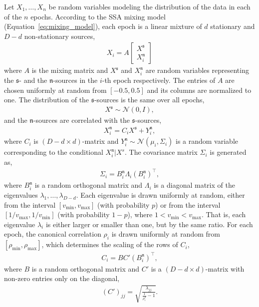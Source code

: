 \documentclass{article}
\newcommand{\N}{\ensuremath{\mathcal{N}}}
\newcommand{\1}{\ensuremath{\mathds{1}}}
\newcommand{\s}{\ensuremath{\mathfrak{s}}}
\newcommand{\n}{\ensuremath{\mathfrak{n}}}
\newcommand{\0}{\ensuremath{0}}
\begin{document}
Let $X_1, \ldots, X_n$ be random variables modeling the distribution of the data in each of 
the $n$ epochs. According to the SSA mixing model (Equation~\ref{eq:mixing_model}), each 
epoch is a linear mixture of $d$ stationary and $D-d$ non-stationary sources, 
\begin{align*}
	X_i = A \begin{bmatrix} X^\s \\ X^\n_i \end{bmatrix}
\end{align*}
where $A$ is the mixing matrix and $X^\s$ and $X^\n_i$ are random variables representing 
the \s- and the \n-sources in the $i$-th epoch respectively. The entries of $A$ are chosen 
uniformly at random from $[-0.5, 0.5]$ and its columns are normalized to one. The distribution
of the \s-sources is the same over all epochs, 
\begin{align*}
	X^\s \sim \N(0,I), 
\end{align*}
and the \n-sources are correlated with the \s-sources, 
\begin{align*}
	X^\n_i = C_i X^\s + Y^\n_i,  
\end{align*}
where $C_i$ is $(D-d \times d)$-matrix and $Y^\n_i \sim \N(\mu_i, \Sigma_i)$ is a
random variable corresponding to the conditional $X^\n_i | X^s$. The covariance 
matrix $\Sigma_i$ is generated as, 
\begin{align*}
	\Sigma_i = B^\n_i \Lambda_i (B^\n_i)^\top,
\end{align*}
where $B^\n_i$ is a random orthogonal matrix and $\Lambda_i$ is a diagonal matrix of 
the eigenvalues $\lambda_1, \ldots, \lambda_{D-d}$. Each eigenvalue is drawn uniformly
at random, either from the interval $[v_\text{min}, v_\text{max}]$ (with probability $p$) 
or from the interval $[1/v_\text{max}, 1/v_\text{min}]$ (with probability $1-p$), where 
$1 < v_\text{min} < v_\text{max}$. That is, each eigenvalue $\lambda_i$ is either larger 
or smaller than one, but by the same ratio. For each epoch, the canonical 
correlation $\rho_i$ is drawn uniformly at random from $[\rho_\text{min}, \rho_\text{max}]$, 
which determines the scaling of the rows of $C_i$, 
\begin{align*}
	C_i = B C' (B^\n_i)^\top, 
\end{align*}
where $B$ is a random orthogonal matrix and $C'$ is a $(D-d \times d)$-matrix with 
non-zero entries only on the diagonal, 
\begin{align*}
	(C')_{jj} = \sqrt{ \frac{\lambda_{jj}}{\frac{1}{\rho_i^2 } - 1}} . 
\end{align*}
\end{document}
